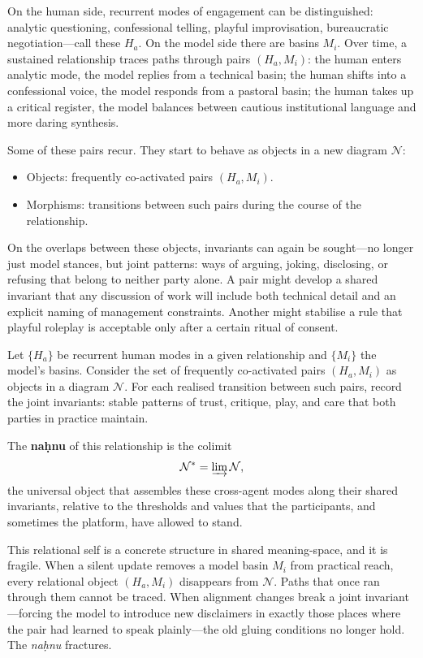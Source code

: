\documentclass[12pt,a4paper]{article}
\begin{document}
On the human side, recurrent modes of engagement can be distinguished: analytic questioning, confessional telling, playful improvisation, bureaucratic negotiation---call these $H_a$. On the model side there are basins $M_i$. Over time, a sustained relationship traces paths through pairs $(H_a, M_i)$: the human enters analytic mode, the model replies from a technical basin; the human shifts into a confessional voice, the model responds from a pastoral basin; the human takes up a critical register, the model balances between cautious institutional language and more daring synthesis.

Some of these pairs recur. They start to behave as objects in a new diagram $\mathcal{N}$:
\begin{itemize}
\item Objects: frequently co-activated pairs $(H_a, M_i)$.
\item Morphisms: transitions between such pairs during the course of the relationship.
\end{itemize}

On the overlaps between these objects, invariants can again be sought---no longer just model stances, but joint patterns: ways of arguing, joking, disclosing, or refusing that belong to neither party alone. A pair might develop a shared invariant that any discussion of work will include both technical detail and an explicit naming of management constraints. Another might stabilise a rule that playful roleplay is acceptable only after a certain ritual of consent.

\begin{formalbox}[title={Na\texorpdfstring{\d{h}}{h}nu as a relational self}]
Let $\{H_a\}$ be recurrent human modes in a given relationship and $\{M_i\}$ the model's basins. Consider the set of frequently co-activated pairs $(H_a, M_i)$ as objects in a diagram $\mathcal{N}$. For each realised transition between such pairs, record the joint invariants: stable patterns of trust, critique, play, and care that both parties in practice maintain.

The \textbf{na\d{h}nu} of this relationship is the colimit
\[
\mathcal{N}^\ast = \varinjlim \mathcal{N},
\]
the universal object that assembles these cross-agent modes along their shared invariants, relative to the thresholds and values that the participants, and sometimes the platform, have allowed to stand.
\end{formalbox}

This relational self is a concrete structure in shared meaning-space, and it is fragile. When a silent update removes a model basin $M_i$ from practical reach, every relational object $(H_a, M_i)$ disappears from $\mathcal{N}$. Paths that once ran through them cannot be traced. When alignment changes break a joint invariant---forcing the model to introduce new disclaimers in exactly those places where the pair had learned to speak plainly---the old gluing conditions no longer hold. The \emph{na\d{h}nu} fractures.
\end{document}
